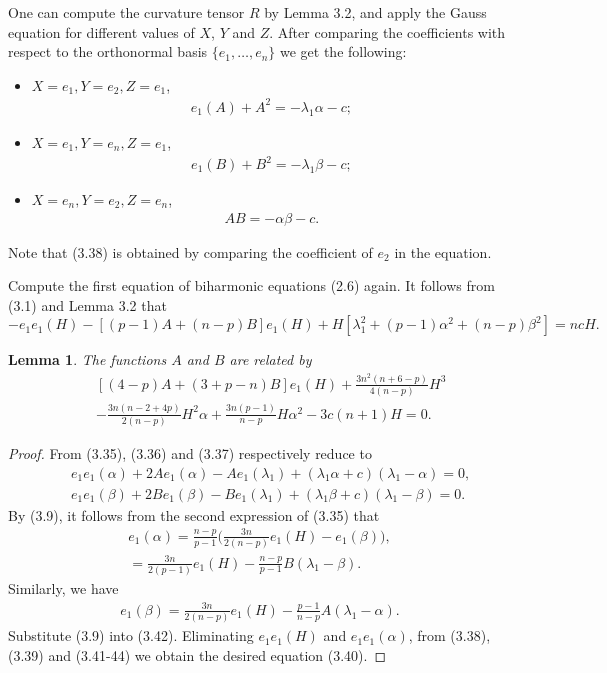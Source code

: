 \documentclass[twoside,reqno,A4]{amsart}
\newtheorem{lemma}[theorem]{Lemma}
\theoremstyle{definition}
\theoremstyle{remark}
\numberwithin{equation}{section}
\begin{document}
One can compute the curvature tensor $R$ by Lemma 3.2, and apply the
Gauss equation for different values of $X$, $Y$ and $Z$. After
comparing the coefficients with respect to the orthonormal basis
$\{e_1, \ldots, e_n\}$ we get the following:
\begin{itemize}
\item $X=e_1, Y=e_2, Z=e_1$,
\begin{eqnarray}
e_1(A)+A^2=-\lambda_1\alpha-c;
\end{eqnarray}
\item $X=e_1, Y=e_n, Z=e_1$,
\begin{eqnarray}
e_1(B)+B^2=-\lambda_1\beta-c;
\end{eqnarray}
\item $X=e_n, Y=e_2, Z=e_n$,
\begin{eqnarray}
AB=-\alpha\beta-c.
\end{eqnarray}
\end{itemize}
Note that (3.38) is obtained by comparing the coefficient of $e_2$
in the equation.

Compute the first equation of biharmonic equations (2.6) again. It
follows from (3.1) and Lemma 3.2 that
\begin{equation}
-e_1e_1(H)-[(p-1)A+(n-p)B]e_1(H)+H[\lambda^2_1+(p-1)\alpha^2+(n-p)\beta^2]=ncH.
\end{equation}
\begin{lemma}
The functions $A$ and $B$ are related by
\begin{eqnarray}
&&[(4-p)A+(3+p-n)B]e_1(H)+\frac{3n^2(n+6-p)}{4(n-p)}H^3\nonumber\\
&&-\frac{3n(n-2+4p)}{2(n-p)}H^2\alpha+\frac{3n(p-1)}{n-p}H\alpha^2-3c(n+1)H=0.
\end{eqnarray}
\end{lemma}
\begin{proof}
From (3.35), (3.36) and (3.37) respectively reduce to
\begin{eqnarray}
&&e_1e_1(\alpha)+2Ae_1(\alpha)-Ae_1(\lambda_1)+(\lambda_1\alpha+c)(\lambda_1-\alpha)=0,\\
&&e_1e_1(\beta)+2Be_1(\beta)-Be_1(\lambda_1)+(\lambda_1\beta+c)(\lambda_1-\beta)=0.
\end{eqnarray}
By (3.9), it follows from the second expression of (3.35) that
\begin{eqnarray}
e_1(\alpha)=\frac{n-p}{p-1}\big(\frac{3n}{2(n-p)}e_1(H)-e_1(\beta)\big),\nonumber\\
=\frac{3n}{2(p-1)}e_1(H)-\frac{n-p}{p-1}B(\lambda_1-\beta).
\end{eqnarray}
Similarly, we have
\begin{eqnarray}
e_1(\beta)=\frac{3n}{2(n-p)}e_1(H)-\frac{p-1}{n-p}A(\lambda_1-\alpha).
\end{eqnarray}
Substitute (3.9) into (3.42). Eliminating $e_1e_1(H)$ and
$e_1e_1(\alpha)$, from (3.38), (3.39) and (3.41-44) we obtain the
desired equation (3.40).
\end{proof}
\end{document}
